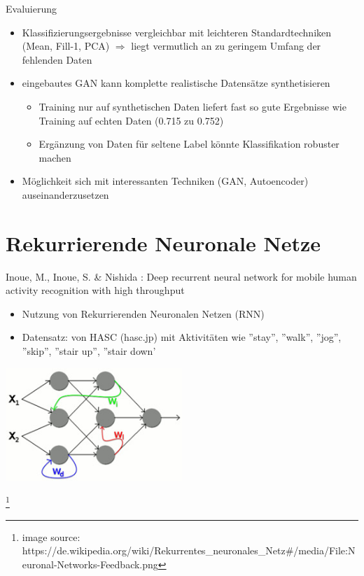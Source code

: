 \documentclass[10pt,%
	wide,%
	xcolor={x11names},%
	hyperref={colorlinks},%
	pantone312,%
	handout,%
	]{beamer}
\begin{document}
\begin{frame}[t]{Evaluierung}
	\begin{itemize}
		\item Klassifizierungsergebnisse vergleichbar mit leichteren Standardtechniken (Mean, Fill-1, PCA) $\Rightarrow$ liegt vermutlich an zu geringem Umfang der fehlenden Daten
		\item eingebautes GAN kann komplette realistische Datensätze synthetisieren
		\begin{itemize}
			\item Training nur auf synthetischen Daten liefert fast so gute Ergebnisse wie Training auf echten Daten (0.715 zu 0.752)
			\item Ergänzung von Daten für seltene Label könnte Klassifikation robuster machen
		\end{itemize}
		\item Möglichkeit sich mit interessanten Techniken (GAN, Autoencoder) auseinanderzusetzen
	\end{itemize}
\end{frame}

\section{Rekurrierende Neuronale Netze}

\begin{frame}[t]{Inoue, M., Inoue, S. \& Nishida  : Deep recurrent neural network for mobile human activity recognition with high throughput}
\begin{itemize}
	\item Nutzung von Rekurrierenden Neuronalen Netzen (RNN)
	\item Datensatz: von HASC (hasc.jp) mit Aktivitäten wie ''stay'', ''walk'', ''jog'', ''skip'', ''stair up'', ''stair down'
\end{itemize}
\begin{center}
	\includegraphics[width=0.5\textwidth]{img/Inoue1}

	\footnote{image source: https://de.wikipedia.org/wiki/Rekurrentes\_neuronales\_Netz\#/media/File:Neuronal-Networks-Feedback.png}
\end{center}

\end{frame}
\end{document}
